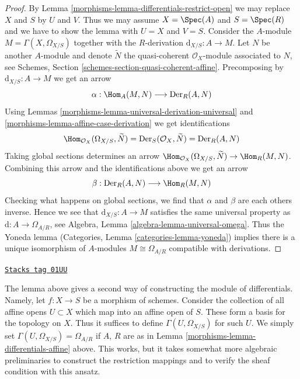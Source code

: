 \begin{proof}

By Lemma \ref{morphisms-lemma-differentials-restrict-open} we may replace
$X$ and $S$ by $U$ and $V$. Thus we may assume $X = \Spec(A)$
and $S = \Spec(R)$ and we have to show the lemma with $U = X$
and $V = S$. Consider the $A$-module $M = \Gamma(X, \Omega_{X/S})$
together with the $R$-derivation $\text{d}_{X/S} : A \to M$.
Let $N$ be another $A$-module and denote $\widetilde{N}$ the quasi-coherent
$\mathcal{O}_X$-module associated to $N$, see
Schemes, Section \ref{schemes-section-quasi-coherent-affine}.
Precomposing by $\text{d}_{X/S} : A \to M$ we get an arrow
$$
\alpha : \Hom_A(M, N) \longrightarrow \text{Der}_R(A, N)
$$
Using Lemmas \ref{morphisms-lemma-universal-derivation-universal} and
\ref{morphisms-lemma-affine-case-derivation} we get identifications
$$
\Hom_{\mathcal{O}_X}(\Omega_{X/S}, \widetilde{N}) =
\text{Der}_S(\mathcal{O}_X, \widetilde{N}) =
\text{Der}_R(A, N)
$$
Taking global sections determines an arrow
$\Hom_{\mathcal{O}_X}(\Omega_{X/S}, \widetilde{N}) \to \Hom_R(M, N)$.
Combining this arrow and the identifications above we get an arrow
$$
\beta : \text{Der}_R(A, N) \longrightarrow \Hom_R(M, N)
$$
Checking what happens on global sections, we find that $\alpha$
and $\beta$ are each others inverse. Hence we see that
$\text{d}_{X/S} : A \to M$ satisfies
the same universal property as $\text{d} : A \to \Omega_{A/R}$,
see Algebra, Lemma \ref{algebra-lemma-universal-omega}. Thus the Yoneda lemma
(Categories, Lemma \ref{categories-lemma-yoneda})
implies there is a unique isomorphism of $A$-modules
$M \cong \Omega_{A/R}$ compatible with derivations.
\end{proof}

\begin{remark}
\label{morphisms-remark-differentials-glue}
\href{https://stacks.math.columbia.edu/tag/01UU}{\texttt{Stacks tag 01UU}}

The lemma above gives a second way of constructing the module of
differentials. Namely, let $f : X \to S$ be a morphism of schemes.
Consider the collection of all affine opens $U \subset X$ which
map into an affine open of $S$. These form a basis for the topology
on $X$. Thus it suffices to define $\Gamma(U, \Omega_{X/S})$
for such $U$. We simply set $\Gamma(U, \Omega_{X/S}) = \Omega_{A/R}$ if
$A$, $R$ are as in Lemma \ref{morphisms-lemma-differentials-affine} above.
This works, but it takes somewhat more algebraic preliminaries
to construct the restriction mappings and to verify the sheaf
condition with this ansatz.
\end{remark}

